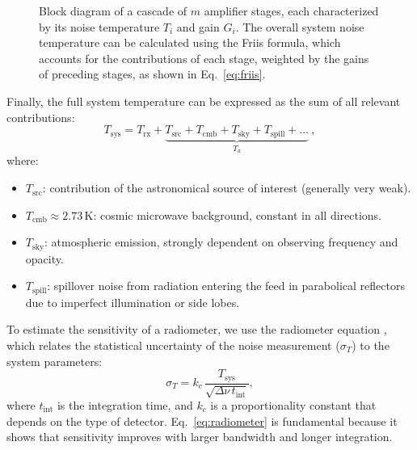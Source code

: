 \begin{figure}[t]
	\centering
	\caption[Block diagram of a cascade of amplifiers]{Block diagram of a cascade of $m$ amplifier stages, each characterized by its noise temperature $T_i$ and gain $G_i$. The overall system noise temperature can be calculated using the Friis formula, which accounts for the contributions of each stage, weighted by the gains of preceding stages, as shown in Eq.\ \ref{eq:friis}.}
	\label{fig:friis}
\end{figure}

Finally, the full system temperature can be expressed as the sum of all relevant contributions:  
\begin{equation}
    T_\text{sys} = T_{\text{rx}} + \underbrace{T_\text{src} + T_\text{cmb} + T_\text{sky} + T_\text{spill}+ \dots}_{T_a} \ ,
\end{equation}
where:
\begin{itemize}
	\item $T_\text{src}$: contribution of the astronomical source of interest (generally very weak).
	\item $T_\text{cmb} \approx 2.73 \, \text{K}$: cosmic microwave background, constant in all directions.
	\item $T_\text{sky}$: atmospheric emission, strongly dependent on observing frequency and opacity.
	\item $T_\text{spill}$: spillover noise from radiation entering the feed in parabolical reflectors due to imperfect illumination or side lobes.
\end{itemize} 

To estimate the sensitivity of a radiometer, we use the radiometer equation \citep[see][Section~3.6.2]{essential_radio_astronomy}, which relates the statistical uncertainty of the noise measurement ($\sigma_T$) to the system parameters:  
\begin{equation}
    \sigma_T = k_c \, \frac{T_\text{sys}}{\sqrt{\Delta \nu \, t_\text{int}}},
	\label{eq:radiometer}
\end{equation}
where $t_\text{int}$ is the integration time, and $k_c$ is a proportionality constant that depends on the type of detector. Eq.\ \ref{eq:radiometer} is fundamental because it shows that sensitivity improves with larger bandwidth and longer integration.  

